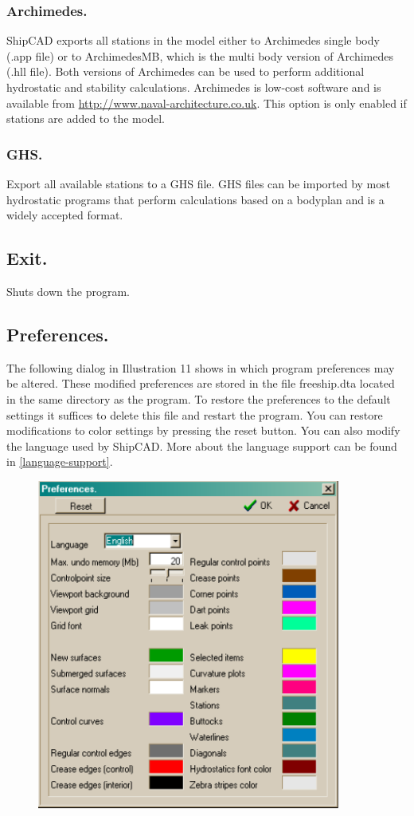 \documentclass[12pt]{article}
\begin{document}
\subsubsection{Archimedes.}
ShipCAD exports all stations in the model either to Archimedes single
body (.app file) or to ArchimedesMB, which is the multi body version
of Archimedes (.hll file). Both versions of Archimedes can be used to
perform additional hydrostatic and stability calculations. Archimedes
is low-cost software and is available
from \url{http://www.naval-architecture.co.uk}. This option is only
enabled if stations are added to the model.

\subsubsection{GHS.}
Export all available stations to a GHS file. GHS files can be imported
by most hydrostatic programs that perform calculations based on a
bodyplan and is a widely accepted format.

\subsection{Exit.}
Shuts down the program.

\subsection{Preferences.}
The following dialog in Illustration 11 shows in which program
preferences may be altered. These modified preferences are stored in
the file freeship.dta located in the same directory as the program. To
restore the preferences to the default settings it suffices to delete
this file and restart the program. You can restore modifications to
color settings by pressing the reset button.  You can also modify the
language used by ShipCAD. More about the language support can be found
in \ref{language-support}.

\begin{figure}[h]
        \centering
        \includegraphics[width=10cm,natwidth=399,natheight=435]{preferencesdialog.png}
        \caption{}
        \label{fig:prefdialog}
\end{figure}
\end{document}
